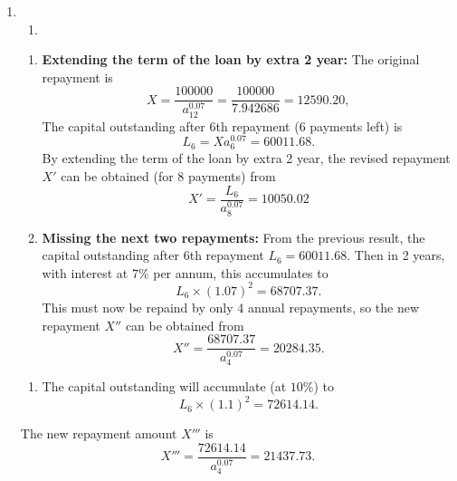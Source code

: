 \documentclass[
]{article}
\providecommand{\tightlist}{%
  \setlength{\itemsep}{0pt}\setlength{\parskip}{0pt}}
\theoremstyle{definition}
\theoremstyle{definition}
\theoremstyle{definition}
\theoremstyle{definition}
\theoremstyle{remark}
\begin{document}
\begin{enumerate}
\def\labelenumi{\arabic{enumi}.}
\setcounter{enumi}{2}
\item
  \begin{enumerate}
  \def\labelenumii{\arabic{enumii}.}
  \tightlist
  \item
  \end{enumerate}

  \begin{enumerate}
  \def\labelenumii{\alph{enumii}.}
  \item
    \textbf{Extending the term of the loan by extra 2 year:} The original repayment is
    \[ X = \frac{100000}{a^{0.07}_{12}} = \frac{100000}{7.942686} = 12590.20,\]
    The capital outstanding after 6th repayment (6 payments left) is
    \[ L_{6} = X a^{0.07}_{6} = 60011.68.  \]
    By extending the term of the loan by extra 2 year, the revised repayment \(X'\) can be obtained (for 8 payments) from
    \[ X' = \frac{L_6}{a^{0.07}_{8}} = 10050.02\]
  \item
    \textbf{Missing the next two repayments:} From the previous result, the capital outstanding after 6th repayment \(L_6 = 60011.68\). Then in 2 years, with interest at \(7\%\) per annum, this accumulates to
    \[ L_6 \times (1.07)^2 = 68707.37. \]
    This must now be repaind by only 4 annual repayments, so the new repayment \(X''\) can be obtained from
    \[ X'' = \frac{68707.37}{a^{0.07}_{4}} = 20284.35.\]
  \end{enumerate}

  \begin{enumerate}
  \def\labelenumii{\arabic{enumii}.}
  \setcounter{enumii}{1}
  \tightlist
  \item
    The capital outstanding will accumulate (at \(10\%\)) to
    \[ L_6 \times (1.1)^2 = 72614.14. \]
  \end{enumerate}

  The new repayment amount \(X'''\) is
  \[X''' = \frac{72614.14}{a^{0.07}_{4}} = 21437.73.\]


\end{enumerate}
\end{document}
